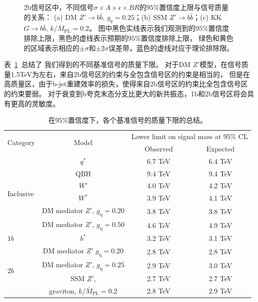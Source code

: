 \begin{figure}[!thbp]
\begin{subfigure}{.99\textwidth}
  \caption{}
  \end{subfigure}
\caption{
  2b信号区中，不同信号$\sigma\times A \times \epsilon \times BR$的$95\%$置信度上限与信号质量的关系：
  (a) DM $Z' \to b\bar{b}$, $g_q=0.25$；(b) SSM $Z' \to b\bar{b}$；(c) KK $G \to b\bar{b}$, $k/\overline{M}_\text{PL}=0.2$。
  图中黑色实线表示我们观测到的$95\%$置信度排除上限，黑色的虚线表示预期的$95\%$置信度排除上限，
  绿色和黄色的区域表示相应的$\pm \sigma$和$\pm 2\sigma$误差带，蓝色的虚线对应于理论排除限。
}
\label{fig:2b}
\end{figure}



表~\ref{tab:limits}~总结了
我们得到的不同基准信号的质量下限。
对于DM $Z'$模型，在信号质量1.5TeV为左右，来自2b信号区的约束与全包含信号区的约束是相当的，
但是在高质量区，由于b-jet重建效率的损失，使得来自2b信号区的约束比全包含信号区的约束要弱。
对于衰变到b夸克末态分支比更大的新共振态，1b和2b信号区将会具有更高的灵敏度。


\begin{table}[htbp]
  \caption{ 在$95\%$置信度下，各个基准信号的质量下限的总结。}
  \centering
  \begin{tabular}{l|c|c|c}
    \hline\hline
    \multirow{2}{*}{Category} & \multirow{2}{*}{Model} & \multicolumn{2}{c}{Lower limit on signal mass at 95\% CL} \\ 
    & & Observed & Expected \\\hline
    \multirow{6}{*}{Inclusive} & $q^*$ & 6.7 TeV & 6.4 TeV  \\
    & QBH & 9.4 TeV  & 9.4 TeV \\
    & $W'$ & 4.0 TeV & 4.2 TeV  \\
    & $W^*$   & 3.9 TeV & 4.1 TeV \\
    & DM mediator $Z'$, $g_\text{q}=0.20$ & 3.8 TeV & 3.8 TeV \\
    & DM mediator $Z'$, $g_\text{q}=0.50$ & 4.6 TeV & 4.9 TeV \\\hline
    $1b$ & $b^*$ & 3.2 TeV & 3.1 TeV \\\hline
    \multirow{4}{*}{$2b$} & DM mediator $Z'$ $g_\text{q}=0.20$ & 2.8 TeV  & 2.8 TeV \\
    & DM mediator $Z'$, $g_\text{q}=0.25$ & 2.9 TeV  & 3.0 TeV \\
    & SSM $Z'$, & 2.7 TeV & 2.7 TeV \\
    & graviton, $k/\overline{M}_\text{PL}=0.2$ & 2.8 TeV & 2.9 TeV \\\hline\hline
  \end{tabular}
  \label{tab:limits}
\end{table}


